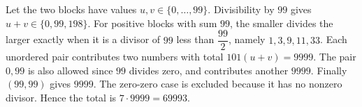 Let the two blocks have values $u,v\in\{0,\ldots,99\}$. Divisibility by $99$ gives $u+v\in\{0,99,198\}$. For positive blocks with sum $99$, the smaller divides the larger exactly when it is a divisor of $99$ less than $\dfrac{99}{2}$, namely $1,3,9,11,33$. Each unordered pair contributes two numbers with total $101(u+v)=9999$. The pair $0,99$ is also allowed since $99$ divides zero, and contributes another $9999$. Finally $(99,99)$ gives $9999$. The zero-zero case is excluded because it has no nonzero divisor. Hence the total is $7\cdot9999=\boxed{69993}$.
